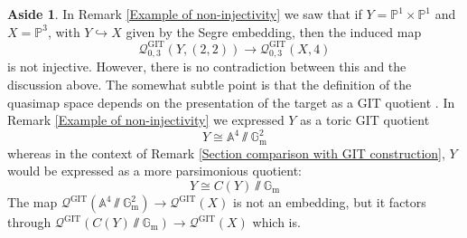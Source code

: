 \documentclass[10pt]{amsart}
\newcommand{\PP}{\mathbb P}
\renewcommand{\to}{\rightarrow}
\newcommand{\Aaff}{\mathbb{A}}
\newcommand{\Gm}{\mathbb{G}_{\text{m}}}
\theoremstyle{definition}
\theoremstyle{definition}
\newtheorem{aside}[thm]{Aside}
\begin{document}
\begin{aside} In Remark \ref{Example of non-injectivity} we saw that if $Y=\PP^1 \times \PP^1$ and $X=\PP^3$, with $Y \hookrightarrow X$ given by the Segre embedding, then the induced map
\begin{equation*} \mathcal{Q}^{\operatorname{GIT}}_{0,3}(Y,(2,2)) \to \mathcal{Q}^{\operatorname{GIT}}_{0,3}(X,4)\end{equation*}
is not injective. However, there is no contradiction between this and the discussion above. The somewhat subtle point is that the definition of the quasimap space depends on the presentation of the target as a GIT quotient \cite[\S 4.6]{CFKM}. In Remark \ref{Example of non-injectivity} we expressed $Y$ as a toric GIT quotient
\begin{equation*} Y \cong \Aaff^4 \sslash \Gm^2 \end{equation*}
whereas in the context of Remark \ref{Section comparison with GIT construction}, $Y$ would be expressed as a more parsimonious quotient:
\begin{equation*} Y \cong C(Y) \sslash \Gm \end{equation*}
The map $\mathcal{Q}^{\operatorname{GIT}}(\Aaff^4\sslash\Gm^2) \to \mathcal{Q}^{\operatorname{GIT}}(X)$ is not an embedding, but it factors through $\mathcal{Q}^{\operatorname{GIT}}(C(Y)\sslash\Gm) \rightarrow \mathcal{Q}^{\operatorname{GIT}}(X)$ which is.

\end{aside}
\end{document}
